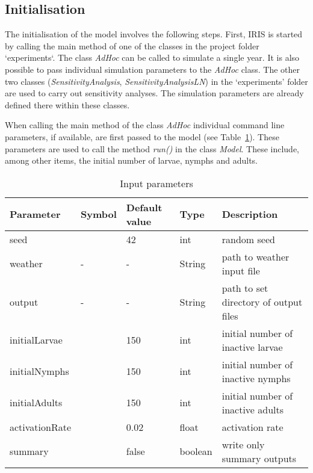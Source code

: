 \documentclass[a4paper, 11pt]{scrartcl}
\begin{document}
\subsection{Initialisation}
The initialisation of the model involves the following steps. First, IRIS is started by calling the main method of one of the classes in the project folder `experiments`.
The class \textit{AdHoc} can be called to simulate a single year. It is also possible to pass individual simulation parameters to the \textit{AdHoc} class. The other two
classes (\textit{SensitivityAnalysis}, \textit{SensitivityAnalysisLN}) in the `experiments' folder are used to carry out sensitivity analyses. The simulation parameters are
already defined there within these classes.

When calling the main method of the class \textit{AdHoc} individual command line parameters, if available, are first passed to the model (see
Table~\ref{tab:initialisation_parameters}). These parameters are used to call the method \textit{run()} in the class \textit{Model}. These include, among other items, the initial
number of larvae, nymphs and adults.

\begin{table}[h!]
\caption{Input parameters}
\label{tab:initialisation_parameters}
\begin{tabularx}{\textwidth}{lllll}
\toprule
\textbf{Parameter} 	& \textbf{Symbol} & \textbf{Default value} & \textbf{Type} & \textbf{Description} \\
\midrule
seed    			&   & 42    & int     & random seed \\
weather     		& - & -     & String  & path to weather input file \\
output     			& - & -     & String  & path to set directory of output files \\
initialLarvae       &   & 150   & int     & initial number of inactive larvae \\
initialNymphs       &   & 150   & int     & initial number of inactive nymphs \\
initialAdults       &   & 150   & int     & initial number of inactive adults \\
activationRate      &   & 0.02  & float   & activation rate  \\
summary       		&   & false & boolean & write only summary outputs \\
\bottomrule
\end{tabularx}
\end{table}
\end{document}
